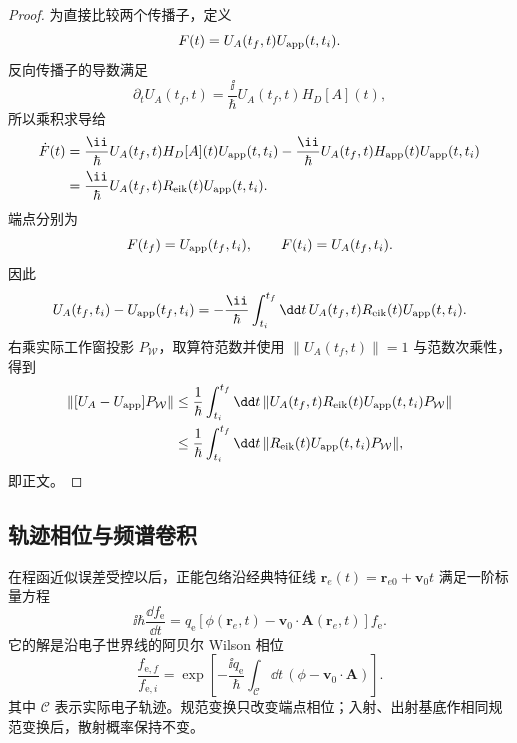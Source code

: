 \begin{proof}
为直接比较两个传播子，定义
\[
F(t)=U_A(t_f,t)U_{\rm app}(t,t_i).
\]
反向传播子的导数满足
\[
\partial_tU_A(t_f,t)=\frac{\ii}{\hbar}U_A(t_f,t)H_D[A](t),
\]
所以乘积求导给
\begin{align*}
\dot F(t)
&=\frac{\ii}{\hbar}U_A(t_f,t)H_D[A](t)U_{\rm app}(t,t_i)
-\frac{\ii}{\hbar}U_A(t_f,t)H_{\rm app}(t)U_{\rm app}(t,t_i)\\
&=\frac{\ii}{\hbar}U_A(t_f,t)R_{\rm eik}(t)U_{\rm app}(t,t_i).
\end{align*}
端点分别为
\[
F(t_f)=U_{\rm app}(t_f,t_i),
\qquad
F(t_i)=U_A(t_f,t_i).
\]
因此
\[
U_A(t_f,t_i)-U_{\rm app}(t_f,t_i)
=-\frac{\ii}{\hbar}\int_{t_i}^{t_f}\dd t\,
U_A(t_f,t)R_{\rm eik}(t)U_{\rm app}(t,t_i).
\]
右乘实际工作窗投影 $P_{\mathcal W}$，取算符范数并使用
$\|U_A(t_f,t)\|=1$ 与范数次乘性，得到
\begin{align*}
\|[U_A-U_{\rm app}]P_{\mathcal W}\|
&\le\frac1\hbar\int_{t_i}^{t_f}\dd t\,
\|U_A(t_f,t)R_{\rm eik}(t)U_{\rm app}(t,t_i)P_{\mathcal W}\|\\
&\le\frac1\hbar\int_{t_i}^{t_f}\dd t\,
\|R_{\rm eik}(t)U_{\rm app}(t,t_i)P_{\mathcal W}\|,
\end{align*}
即正文。
\end{proof}


\subsection{轨迹相位与频谱卷积}

在程函近似误差受控以后，正能包络沿经典特征线 $\mathbf r_e(t)=\mathbf r_{e0}+\mathbf v_0t$ 满足一阶标量方程
\begin{equation}
\boxed{
\ii\hbar\frac{\dd f_{\mathrm e}}{\dd t}
=q_{\mathrm e}[\phi(\mathbf r_e,t)-\mathbf v_0\cdot\mathbf A(\mathbf r_e,t)]f_{\mathrm e}.}
\label{eq:general_gauge_covariant_eikonal}
\end{equation}
它的解是沿电子世界线的阿贝尔 Wilson 相位
\begin{equation}
\boxed{
\frac{f_{\mathrm e,f}}{f_{\mathrm e,i}}
=\exp\!\left[-\frac{\ii q_{\mathrm e}}{\hbar}
\int_{\mathcal C}\dd t\,(\phi-\mathbf v_0\cdot\mathbf A)\right].}
\label{eq:general_eikonal_wilson_phase}
\end{equation}
其中 $\mathcal C$ 表示实际电子轨迹。规范变换只改变端点相位；入射、出射基底作相同规范变换后，散射概率保持不变。

